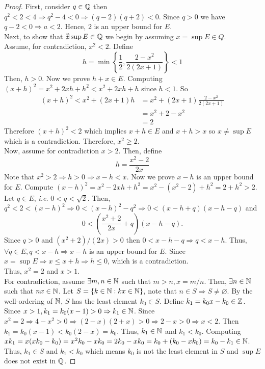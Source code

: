 \begin{proof}
    First, consider $q \in \mathbb{Q}$ then $q^2 <  2 < 4 \Rightarrow q^2 - 4 < 0 \Rightarrow (q-2)(q+2) < 0$. Since $q > 0$ we have $q - 2 < 0 \Rightarrow a <  2$. Hence, $2$ is an upper bound for $E$.\\
    Next, to show that $\nexists \sup E \in \mathbb{Q}$ we begin by assuming $x = \sup E \in Q$. \\
    Assume, for contradiction, $x^2 < 2$. Define
    \begin{equation*}
        h = \min \left\{ 
            \frac{1}{2}, \frac{2 - x^2}{2(2x+1)}
        \right\} < 1
    \end{equation*}
    Then, $h > 0$. Now we prove $h + x \in E$. Computing $(x+h)^2 = x^2 +2xh + h^2 < x^2 + 2xh + h$ since $h < 1$. So
    \begin{equation*}
        \begin{split}
            (x+ h)^2 < x^2 + (2x + 1)h &= x^2 + (2x+1)\frac{2-x^2}{2(2x+1)} \\
            &= x^2 + 2 - x^2 \\
            &= 2
        \end{split}
    \end{equation*}
    Therefore $(x+h)^2 < 2$ which implies $x + h \in E$ and $x + h > x$ so $x \neq \sup E$ which is a contradiction. Therefore, $x^2 \geq 2$. \\
    Now, assume for contradiction $x > 2$. Then, define
    \begin{equation*}
        h = \frac{x^2 - 2}{2x}
    \end{equation*}
    Note that $x^2 > 2 \Rightarrow h > 0 \Rightarrow x - h < x$. Now we prove $x-h$ is an upper bound for $E$. Compute $(x-h)^2 = x^2 -2xh + h^2 = x^2 - (x^2 - 2) + h^2 = 2 + h^2 > 2$. Let $q \in E$, \emph{i.e.} $0 < q < \sqrt{2}$. Then, $q^2 < 2 < (x - h)^2 \Rightarrow 0 <  (x - h)^2 - q^2 \Rightarrow 0 < (x-h+q)(x-h-q)$ and
    \begin{equation*}
        0 < \left(
            \frac{x^2+2}{2x} + q
        \right)(x-h-q).
    \end{equation*}
    Since $q > 0$ and $(x^2+2)/(2x) > 0$ then $0 < x-h-q \Rightarrow q < x-h$. Thus, $\forall q \in E, q < x - h \Rightarrow x-h$ is an upper bound for $E$. Since $x = \sup E \Rightarrow x \leq x + h \Rightarrow h \leq 0$, which is a contradiction. \\
    Thus, $x^2 = 2$ and $x > 1$. \\
    For contradiction, assume $\exists m,n \in \mathbb{N}$ such that $m > n, x = m/n$. Then, $\exists n \in \mathbb{N}$ such that $nx \in \mathbb{N}$. Let $S = \{ k \in \mathbb{N}: kx \in \mathbb{N}\}$, note that $n \in S \Rightarrow S \neq \varnothing$. By the well-ordering of $\mathbb{N}$, $S$ has the least element $k_0 \in S$. Define $k_1 = k_0x-k_0 \in \mathbb{Z}$. Since $x > 1, k_1 = k_0(x-1) > 0 \Rightarrow k_1 \in \mathbb{N}$. Since $x^2 = 2 \Rightarrow 4 - x^2 > 0 \Rightarrow (2-x)(2+x) > 0 \Rightarrow 2-x > 0 \Rightarrow x < 2$. Then $k_1 = k_0(x-1) < k_0(2-x) = k_0$. Thus, $k_1 \in \mathbb{N}$ and $k_1 < k_0$. Computing $xk_1 = x(xk_0 -k_0) = x^2k_0 - xk_0 = 2k_0 - xk_0 = k_0 + (k_0 - xk_0) = k_0 - k_1 \in \mathbb{N}$. Thus, $k_1 \in S$ and $k_1 < k_0$ which means $k_0$ is not the least element in $S$ and $\sup E$ does not exist in $\mathbb{Q}$.

\end{proof}
